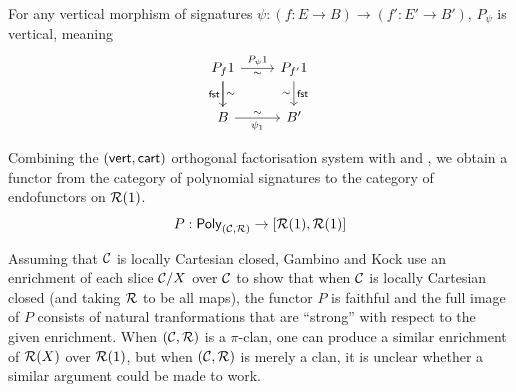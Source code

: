 \begin{proposition}
  For any vertical morphism of signatures
  $\psi : (f : E \to B) \to (f' : E' \to B')$,
  $P_\psi$ is vertical, meaning
  \[\begin{tikzcd}
      {P_f 1} & {P_{f'} 1} \\
      B & {B'}
      \arrow["{P_\psi 1}", from=1-1, to=1-2]
      \arrow["\sim"', draw=none, from=1-1, to=1-2]
      \arrow["\sim", from=1-1, to=2-1]
      \arrow["\fstProj"', no head, from=1-1, to=2-1]
      \arrow["\sim"', from=1-2, to=2-2]
      \arrow["\fstProj", draw=none, from=1-2, to=2-2]
      \arrow["{\psi_1}"', from=2-1, to=2-2]
      \arrow["\sim", draw=none, from=2-1, to=2-2]
    \end{tikzcd}\]
\end{proposition}

\begin{definition}
Combining the $(\mathsf{vert}, \mathsf{cart})$ orthogonal factorisation system
with  and ,
we obtain a functor from the category of polynomial signatures
to the category of endofunctors on $\mathcal{R}(1)$.
\[
  P : \mathsf{Poly}_{(\mathcal{C},\mathcal{R})} \to [\mathcal{R}(1), \mathcal{R}(1)]
\]
\end{definition}

\begin{remark}
  Assuming that $\mathcal{C}$ is locally Cartesian closed,
  Gambino and Kock \cite{gambino2013} use an enrichment of each slice $\mathcal{C} / X$ over $\mathcal{C}$
  to show that when $\mathcal{C}$ is locally Cartesian closed (and taking $\mathcal{R}$ to be all maps),
  the functor $P$ is faithful and the full image of $P$ consists of natural tranformations
  that are ``strong'' with respect to the given enrichment.
  When $(\mathcal{C},\mathcal{R})$ is a $\pi$-clan,
  one can produce a similar enrichment of $\mathcal{R}(X)$ over $\mathcal{R}(1)$,
  but when $(\mathcal{C},\mathcal{R})$ is merely a clan,
  it is unclear whether a similar argument could be made to work.
\end{remark}
